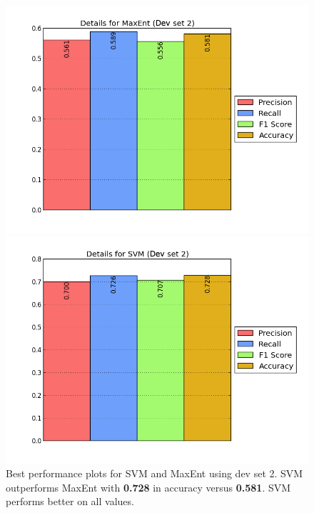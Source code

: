 \begin{figure}[!htb]
	\centering
	\begin{minipage}{.45\linewidth}
		\includegraphics[width=\linewidth]{../img/plots/analysis/maxent_stats_best_diff_test.png}
	\end{minipage}
	\hspace{0.05\linewidth}
	\begin{minipage}{.45\linewidth}
		\includegraphics[width=\linewidth]{../img/plots/analysis/svm_stats_best_diff_test.png}
	\end{minipage}
	\caption[Best performance plots for SVM and MaxEnt for dev set 2]{Best performance plots for SVM and MaxEnt using dev set 2. SVM outperforms MaxEnt with \textbf{0.728} in accuracy versus \textbf{0.581}. SVM performs better on all values.}
	\label{fig:best_result_testset2}
\end{figure}

